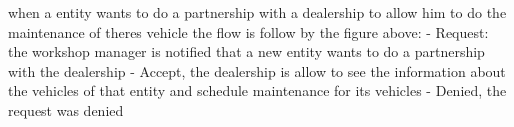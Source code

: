 when a entity wants to do a partnership with a dealership to allow him to do the maintenance of theres vehicle the flow is follow by the figure above:
- Request: the workshop manager is notified that a new entity wants to do a partnership with the dealership
- Accept, the dealership is allow to see the information about the vehicles of that entity and schedule maintenance for its vehicles
- Denied, the request was denied





